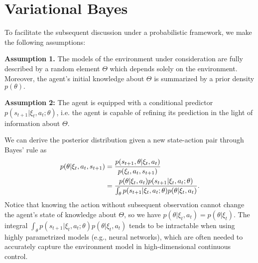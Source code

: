\documentclass{article}
\begin{document}
	\section{Variational Bayes}
	To facilitate the subsequent discussion under a probabilistic framework, we make the following assumptions:
	
	\textbf{Assumption 1.} The models of the environment under consideration are fully described by a random element $\Theta$ which depends solely on the environment. Moreover, the agent's initial knowledge about $\Theta$ is summarized by a prior density $p(\theta).$
	
	\textbf{Assumption 2:} The agent is equipped with a conditional predictor $p(s_{t+1}|\xi_t,a_t;\theta)$, i.e. the agent is capable of refining its prediction in the light of information about $\Theta$.
	
	\noindent We can derive the posterior distribution given a new state-action pair through Bayes' rule as
	\begin{align}
		p(\theta|\xi_t,a_t,s_{t+1}) &=\frac{p(s_{t+1},\theta|\xi_t,a_t)}{p(\xi_t,a_t,s_{t+1})}\notag\\ 
		&=\frac{p(\theta|\xi_t,a_t)p(s_{t+1}|\xi_t,a_t;\theta)}{\int_{\theta}p(s_{t+1}|\xi_t,a_t;\theta)p(\theta|\xi_t,a_t)}.
	\end{align}
	 Notice that knowing the action without subsequent observation cannot change the agent's state of knowledge about $\Theta$, so we have $p(\theta|\xi_t,a_t) = p(\theta|\xi_t)$. The integral $\int_{\theta}p(s_{t+1}|\xi_t,a_t;\theta)p(\theta|\xi_t,a_t)$ tends to be intractable when using highly parametrized models (e.g., neural networks), which are often needed to accurately capture the environment model in high-dimensional continuous control.
	 
\end{document}
